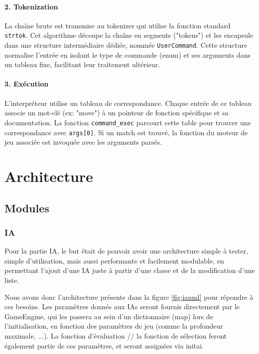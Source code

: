 \documentclass[11pt,a4paper,titlepage,oneside]{article}
\begin{document}
    \paragraph{2. Tokenization } La chaîne brute est transmise au tokenizer qui utilise la fonction standard \texttt{strtok}. Cet algorithme découpe la chaîne en segments ("tokens") et les encapsule dans une structure intermédiaire dédiée, nommée \texttt{UserCommand}. Cette structure normalise l'entrée en isolant le type de commande (enum) et ses arguments dans un tableau fixe, facilitant leur traitement ultérieur.
    
    \paragraph{3. Exécution } L'interpréteur utilise un tableau de correspondance. Chaque entrée de ce tableau associe un mot-clé (ex: "move") à un pointeur de fonction spécifique et sa documentation. La fonction \texttt{command\_exec} parcourt cette table pour trouver une correspondance avec \texttt{args[0]}. Si un match est trouvé, la fonction du moteur de jeu associée est invoquée avec les arguments parsés.

        
    \section{Architecture}
    \subsection{Modules}
    \subsubsection{IA}    
    
    Pour la partie IA, le but était de pouvoir avoir une architecture simple à tester, simple d'utilisation, mais aussi performante et facilement modulable, en permettant l'ajout d'une IA juste à partir d'une classe et de la modification d'une liste. 
    
    Nous avons donc l'architecture présente dans la figure \ref{fig:iauml} pour répondre à ces besoins. Les paramètres donnés aux IAs seront fournis directement par le GameEngine, qui les passera au sein d'un dictionnaire (map) lors de l'initialisation, en fonction des paramètres de jeu (comme la profondeur maximale, ...). La fonction d'évaluation // la fonction de sélection feront également partie de ces paramètres, et seront assignées via init\textunderscore ai.
    
\end{document}
